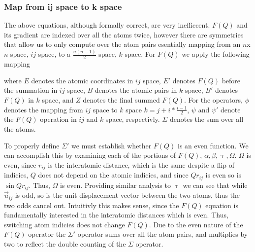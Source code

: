 \subsubsection{Map from ij space to k space}
The above equations, although formally correct, are very ineffiecent. $F(Q)$ and its gradient are indexed over all the atoms twice, however there are symmetries that allow us to only compute over the atom pairs esentially mapping from an $n$x$n$ space, $ij$ space, to a $\frac{n(n-1)}{2}$ space, $k$ space.
For $F(Q)$ we apply the following mapping
\begin{figure}[!ht]
\begin{center}
\end{center}
\end{figure}
where $E$ denotes the atomic coordinates in $ij$ space, $E'$ denotes $F(Q)$ before the summation in $ij$ space, $B$ denotes the atomic pairs in $k$ space, $B'$ denotes $F(Q)$ in $k$ space, and $Z$ denotes the final summed $F(Q)$.  For the operators, $\phi$ denotes the mapping from $ij$ space to $k$ space $k = j + i * \frac{i - 1}{2}$, $\psi$ and $\psi'$ denote the $F(Q)$ operation in $ij$ and $k$ space, respectivly. $\Sigma$ denotes the sum over all the atoms.  

To properly define $\Sigma'$ we must establish whether $F(Q)$ is an even function.  
We can accomplish this by examining each of the portions of $F(Q)$, $\alpha, \beta ,\uptau, \Omega$.
$\Omega$ is even, since $r_{ij}$ is the interatomic distance, which is the same despite a flip of indicies, $Q$ does not depend on the atomic indicies, and since $Qr_{ij}$ is even so is $\sin{Qr_{ij}}$.  Thus, $\Omega$ is even.  Providing similar analysis to $\uptau$ we can see that while $\vec{u}_{ij}$ is odd, so is the unit displacement vector between the two atoms, thus the two odds cancel out.
Intuitivly this makes sense, since the $F(Q)$ equation is fundamentally interested in the interatomic distances which is even.  Thus, switching atom indicies does not change $F(Q)$.
Due to the even nature of the $F(Q)$ operator the $\Sigma'$ operator sums over all the atom pairs, and multiplies by two to reflect the double counting of the $\Sigma$ operator.

